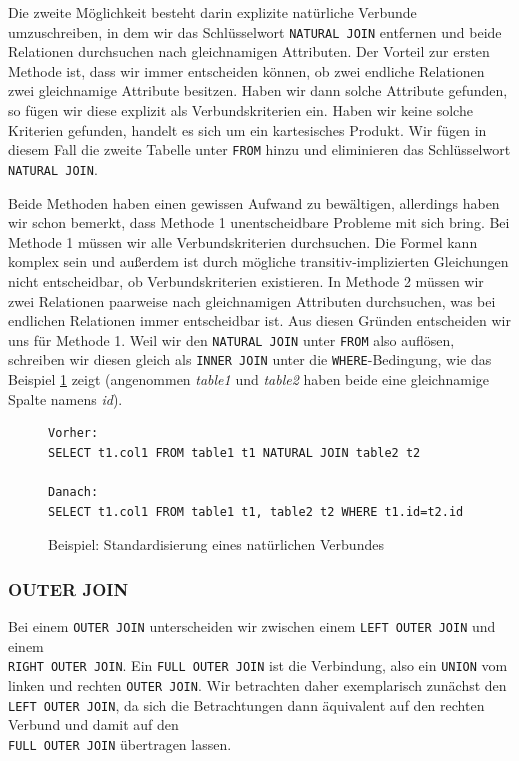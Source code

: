 Die zweite Möglichkeit besteht darin explizite natürliche Verbunde umzuschreiben, in dem wir das Schlüsselwort \verb|NATURAL JOIN| entfernen und beide Relationen durchsuchen nach gleichnamigen Attributen. Der Vorteil zur ersten Methode ist, dass wir immer entscheiden können, ob zwei endliche Relationen zwei gleichnamige Attribute besitzen. Haben wir dann solche Attribute gefunden, so fügen wir diese explizit als Verbundskriterien ein. Haben wir keine solche Kriterien gefunden, handelt es sich um ein kartesisches Produkt. Wir fügen in diesem Fall die zweite Tabelle unter \verb|FROM| hinzu und eliminieren das Schlüsselwort \verb|NATURAL JOIN|.

Beide Methoden haben einen gewissen Aufwand zu bewältigen, allerdings haben wir schon bemerkt, dass Methode 1 unentscheidbare Probleme mit sich bring. Bei Methode 1 müssen wir alle Verbundskriterien durchsuchen. Die Formel kann komplex sein und außerdem ist durch mögliche transitiv-implizierten Gleichungen nicht entscheidbar, ob Verbundskriterien existieren. In Methode 2 müssen wir zwei Relationen paarweise nach gleichnamigen Attributen durchsuchen, was bei endlichen Relationen immer entscheidbar ist.
Aus diesen Gründen entscheiden wir uns für Methode 1. Weil wir den \verb|NATURAL JOIN| unter \verb|FROM| also auflösen, schreiben wir diesen gleich als \verb|INNER JOIN| unter die \verb|WHERE|-Bedingung, wie das  Beispiel \ref{bsp:natjoin} zeigt (angenommen \textit{table1} und \textit{table2} haben beide eine gleichnamige Spalte namens \textit{id}).

\begin{figure}
\begin{verbatim}
Vorher:
SELECT t1.col1 FROM table1 t1 NATURAL JOIN table2 t2

Danach:
SELECT t1.col1 FROM table1 t1, table2 t2 WHERE t1.id=t2.id
\end{verbatim}
\caption{Beispiel: Standardisierung eines natürlichen Verbundes}
\label{bsp:natjoin}
\end{figure}

\subsubsection*{OUTER JOIN}

Bei einem \verb|OUTER JOIN| unterscheiden wir zwischen einem \verb|LEFT OUTER JOIN| und einem \\\verb|RIGHT OUTER JOIN|. Ein \verb|FULL OUTER JOIN| ist die Verbindung, also ein \verb|UNION| vom linken und rechten \verb|OUTER JOIN|. Wir betrachten daher exemplarisch zunächst den \verb|LEFT OUTER JOIN|, da sich die Betrachtungen dann äquivalent auf den rechten Verbund und damit auf den \\\verb|FULL OUTER JOIN| übertragen lassen.

